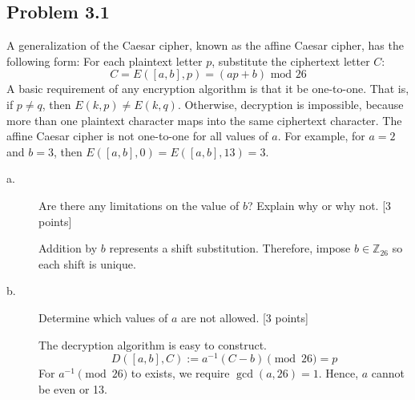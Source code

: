 \documentclass[../hw_sols.tex]{subfiles}
\begin{document}

\subsection*{Problem 3.1}
A generalization of the Caesar cipher, known as the affine Caesar cipher, has the following form: For each plaintext letter $p$, substitute the ciphertext letter $C$:
	$$C = E([a,b], p) = (ap + b) \text{ mod 26}$$
A basic requirement of any encryption algorithm is that it be one-to-one. That is, if $p \neq q$, then $E(k,p) \neq E(k,q)$. Otherwise, decryption is impossible, because more than one plaintext character maps into the same ciphertext character. The affine Caesar cipher is not one-to-one for all values of $a$. For example, for $a = 2$ and $b = 3$, then $E([a,b], 0) = E([a,b], 13) = 3$.

\begin{description}

\item[a.] Are there any limitations on the value of $b$? Explain why or why not. [3 points]

\begin{solution}
Addition by $b$ represents a shift substitution. Therefore, impose $b \in \mathbb{Z}_{26}$ so each shift is unique.
\end{solution}

\item[b.] Determine which values of $a$ are not allowed. [3 points]

\begin{solution}
The decryption algorithm is easy to construct.
$$D([a,b],C) := a^{-1}(C-b) \pmod{26} = p$$
For $a^{-1} \pmod{26}$ to exists, we require $\gcd(a,26) = 1$. Hence, $a$ cannot be even or 13.
\end{solution}

\end{description}


\newpage


\end{document}
